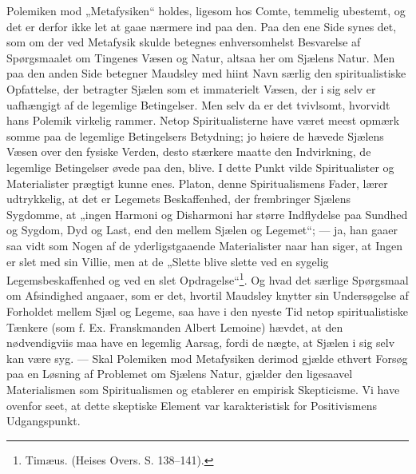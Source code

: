 \documentclass[12pt,a4paper,openany]{book}
\newcommand{\opage}[1]{\marginnote{\footnotesize\textit{[#1]}}}
\begin{document}
Polemiken mod „Metafysiken“ holdes, ligesom hos Comte,
temmelig ubestemt, og det er derfor ikke let at gaae nærmere
ind paa den. Paa den ene Side synes det, som om der
ved Metafysik skulde betegnes enhversomhelst Besvarelse af
Spørgsmaalet om Tingenes Væsen og Natur, altsaa her
om Sjælens Natur. Men paa den anden Side betegner
Maudsley med hiint Navn særlig den spiritualistiske Opfattelse,
der betragter Sjælen som et immaterielt Væsen, der i
sig selv er uafhængigt af de legemlige Betingelser. Men
selv da er det tvivlsomt, hvorvidt hans Polemik virkelig
rammer. Netop Spiritualisterne have været meest opmærk%
\opage{312}somme paa de legemlige Betingelsers Betydning; jo høiere
de hævede Sjælens Væsen over den fysiske Verden, desto
stærkere maatte den Indvirkning, de legemlige Betingelser
øvede paa den, blive. I dette Punkt vilde Spiritualister og
Materialister prægtigt kunne enes. Platon, denne Spiritualismens
Fader, lærer udtrykkelig, at det er Legemets Beskaffenhed,
der frembringer Sjælens Sygdomme, at „ingen Harmoni og
Disharmoni har større Indflydelse paa Sundhed og Sygdom,
Dyd og Last, end den mellem Sjælen og Legemet“; --- ja, han
gaaer saa vidt som Nogen af de yderligstgaaende Materialister
naar han siger, at Ingen er slet med sin Villie, men at de „Slette
blive slette ved en sygelig Legemsbeskaffenhed og ved en slet Opdragelse“\footnote{Timæus. (Heises Overs. S. 138--141).}. Og hvad det særlige Spørgsmaal om Afsindighed
angaaer, som er det, hvortil Maudsley knytter sin Undersøgelse
af Forholdet mellem Sjæl og Legeme, saa have
i den nyeste Tid netop spiritualistiske Tænkere (som f. Ex.
Franskmanden Albert Lemoine) hævdet, at den nødvendigviis
maa have en legemlig Aarsag, fordi de nægte, at Sjælen i
sig selv kan være syg. --- Skal Polemiken mod Metafysiken
derimod gjælde ethvert Forsøg paa en Løsning af Problemet
om Sjælens Natur, gjælder den ligesaavel Materialismen
som Spiritualismen og etablerer en empirisk
Skepticisme. Vi have ovenfor seet, at dette skeptiske Element
var karakteristisk for Positivismens Udgangspunkt.
\end{document}
